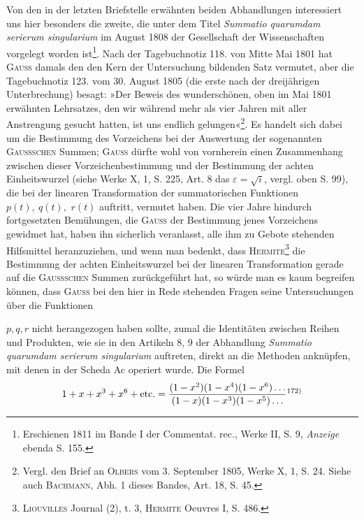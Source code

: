 \par
Von den in der letzten Briefstelle erwähnten beiden Abhandlungen interessiert
uns hier besonders die zweite, die unter dem Titel \textit{Summatio quarumdam
serierum singularium} im August 1808 der Gesellschaft der Wissenschaften vorgelegt
worden ist\footnote{Erschienen 1811 im Bande I der Commentat. rec., Werke II, S. 9, \textit{Anzeige} ebenda S. 155.}. Nach der Tagebuchnotiz 118. von Mitte Mai 1801 hat
\textsc{Gauss} damals den den Kern der Untersuchung bildenden Satz vermutet, aber
die Tagebuchnotiz 123. vom 30. August 1805 (die erste nach der dreijährigen
Unterbrechung) besagt: »Der Beweis des wunderschönen, oben im Mai 1801
erwähnten Lehrsatzes, den wir während mehr als vier Jahren mit aller Anstrengung
gesucht hatten, ist uns endlich gelungen«\footnote{Vergl. den Brief an \textsc{Olbers} vom 3. September 1805, Werke X, 1, S. 24. Siehe auch \textsc{Bachmann}, Abh. 1 dieses Bandes, Art. 18, S. 45.}. Es handelt sich dabei
um die Bestimmung des Vorzeichens bei der Auswertung der sogenannten
\textsc{Gaussschen} Summen; \textsc{Gauss} dürfte wohl von vornherein einen Zusammenhang
zwischen dieser Vorzeichenbestimmung und der Bestimmung der achten Einheitswurzel
(siehe Werke X, 1, S. 225, Art. 8 das \(\varepsilon=\sqrt{i}\), vergl. oben S. 99),
die bei der linearen Transformation der summatorischen Funktionen \(p(t),\ q(t),\)
\(r(t)\) auftritt, vermutet haben. Die vier Jahre hindurch fortgesetzten Bemühungen,
die \textsc{Gauss} der Bestimmung jenes Vorzeichens gewidmet hat, haben ihn sicherlich
veranlasst, alle ihm zu Gebote stehenden Hilfsmittel heranzuziehen, und
wenn man bedenkt, dass \textsc{Hermite}\footnote{\textsc{Liouvilles} Journal (2), t. 3, \textsc{Hermite} Oeuvres I, S. 486.} die Bestimmung der achten Einheitswurzel
bei der linearen Transformation gerade auf die \textsc{Gaussschen} Summen
zurückgeführt hat, so würde man es kaum begreifen können, dass \textsc{Gauss} bei
den hier in Rede stehenden Fragen seine Untersuchungen über die Funktionen\par
\clearpage{}
\noindent \(p,q,r\) nicht herangezogen haben sollte, zumal die Identitäten zwischen Reihen
und Produkten, wie sie in den Artikeln 8, 9 der Abhandlung \textit{Summatio quarumdam
serierum singularium} auftreten, direkt an die Methoden anknüpfen, mit
denen in der Scheda Ac operiert wurde. Die Formel
\[
1+x+x^3+x^6+\text{etc.}=\frac{(1-x^2)(1-x^4)(1-x^6)\ldots}{(1-x)(1-x^3)(1-x^5)\ldots}\text{\textsuperscript{172)}}
\]
